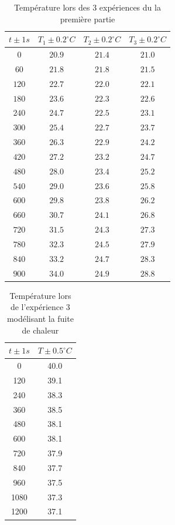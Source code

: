 \documentclass[12pt]{article}
\begin{document}
\begin{table}
	\begin{center}
		\begin{tabular}{|c|c|c|c|}
		\hline
		$t\pm 1 s$ & $T_1 \pm 0.2^{\circ}C$ & $T_2 \pm 0.2^{\circ}C$ & $T_3 \pm 0.2^{\circ}C$ \\
		\hline
		$0$ & $20.9$ & $21.4$  & $21.0$\\
		$60$ & $21.8$ & $21.8$ & $21.5$\\
		$120$ & $22.7$ & $22.0$  & $22.1$\\
		$180$ & $23.6$ & $22.3$  & $22.6$\\
		$240$ & $24.7$ & $22.5$  & $23.1$\\
		$300$ & $25.4$ & $22.7$  & $23.7$\\
		$360$ & $26.3$ & $22.9$  & $24.2$\\
		$420$ & $27.2$ & $23.2$  & $24.7$\\
		$480$ & $28.0$ & $23.4$  & $25.2$\\
		$540$ & $29.0$ & $23.6$  & $25.8$\\
		$600$ & $29.8$ & $23.8$  & $26.2$\\
		$660$ & $30.7$ & $24.1$  & $26.8$\\
		$720$ & $31.5$ & $24.3$  & $27.3$\\
		$780$ & $32.3$ & $24.5$  & $27.9$\\
		$840$ & $33.2$ & $24.7$  & $28.3$\\
		$900$ & $34.0$ & $24.9$  & $28.8$\\
		\hline
		\end{tabular}
	\end{center}
	\caption{Température lors des 3 expériences du la première partie}
\end{table}

\begin{table}[h!]
	\begin{center}
		\begin{tabular}{|c|c|}
			\hline
			$t \pm 1 s$ & $T \pm 0.5^\circ C$ \\ \hline
			0 & 40.0    \\
			120 & 39.1 \\
			240 & 38.3 \\
			360 & 38.5 \\
			480 & 38.1 \\
			600 & 38.1 \\
			720 & 37.9 \\
			840 & 37.7 \\
			960 & 37.5 \\
			1080 & 37.3 \\
			1200 & 37.1 \\ \hline
		\end{tabular}
	\end{center}
	\caption{Température lors de l'expérience 3 modélisant la fuite de chaleur}
\end{table}
\end{document}
